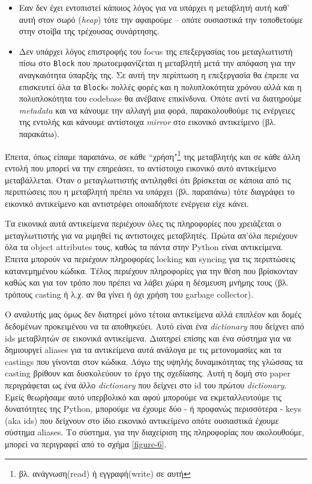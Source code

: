 \begin{itemize}

\item Εαν δεν έχει εντοπιστεί κάποιος λόγος για να υπάρχει η μεταβλητή αυτή
καθ' αυτή στον σωρό (\textit{heap}) τότε την αφαιρούμε – οπότε ουσιαστικά την
τοποθετούμε στην στοίβα της τρέχουσας συνάρτησης.

\item Δεν υπάρχει λόγος επιστροφής του focus της επεξεργασίας του μεταγλωττιστή
πίσω στο \texttt{Block} που πρωτοεμφανίζεται η μεταβλητή μετά την απόφαση για
την αναγκαιότητα ύπαρξής της. Σε αυτή την περίπτωση η επεξεργασία θα έπρεπε να
επισκευτεί όλα τα \texttt{Block}s πολλές φορές και η πολυπλοκότητα χρόνου αλλά
και η πολυπλοκότητα του codebase θα ανέβαινε επικίνδυνα. Οπότε αντί να
διατηρούμε \textit{metadata} και να κάνουμε την αλλαγή μια φορά, παρακολουθούμε
τις ενέργειες της εντολής και κάνουμε αντίστοιχα \textit{mirror} στο εικονικό
αντικείμενο (βλ. παρακάτω).

\end{itemize}

Έπειτα, όπως είπαμε παραπάνω, σε κάθε ``χρήση"\footnote{βλ. ανάγνωση(read) ή
εγγραφή(write) σε αυτή} της μεταβλητής και σε κάθε άλλη εντολή που μπορεί να την
επηρεάσει, το αντίστοιχο εικονικό αυτό αντικείμενο μεταβάλλεται. Όταν ο
μεταγλωττιστής αντιληφθεί ότι βρίσκεται σε κάποια από τις περιπτώσεις που η
μεταβλητή πρέπει να υπάρχει (βλ. παραπάνω) τότε διαγράφει το εικονικό
αντικείμενο και αντιστρέφει οποιαδήποτε ενέργεια είχε κάνει.

Τα εικονικά αυτά αντικείμενα περιέχουν όλες τις πληροφορίες που χρειάζεται ο
μεταγλωττιστής για να μιμηθεί τις αντιστοιχες μεταβλητές. Πρώτα απ'όλα περιέχουν
όλα τα object attributes τους, καθώς τα πάντα στην Python είναι αντικείμενα.
Έπειτα μπορούν να περιέχουν πληροφορίες locking και syncing για τις περιπτώσεις
κατανεμημένου κώδικα. Τέλος περιέχουν πληροφορίες για την θέση που βρίσκονταν
καθώς και για τον τρόπο που πρέπει να λάβει χώρα η δέσμευση μνήμης τους (βλ.
τρόπους casting ή λ.χ. αν θα γίνει ή όχι χρήση του garbage collector).

Ο αναλυτής μας όμως δεν διατηρεί μόνο τέτοια αντικείμενα αλλά επιπλέον και δομές
δεδομένων προκειμένου να τα αποθηκεύει. Αυτό είναι ένα \textit{dictionary} που
δείχνει από ids μεταβλητών σε εικονικά αντικείμενα. Διατηρεί επίσης και ένα
σύστημα για να δημιουργεί aliases για τα αντικείμενα αυτά ανάλογα με τις
μετονομασίες και τα castings που γίνονται στον κώδικα. Λόγω της υψηλής
δυναμικότητας της γλώσσας τα casting βρίθουν και δυσκολεύουν το έργο της
σχεδίασης. Αυτή η δομή στο paper περιγράφεται ως ένα άλλο \textit{dictionary}
που δείχνει στο id του πρώτου \textit{dictionary}. Εμείς θεωρήσαμε αυτό
υπερβολικό και αφού μπορούμε να εκμεταλλευτούμε τις δυνατότητες της Python,
μπορούμε να έχουμε δύο - ή προφανώς περισσότερα - keys (aka ids) που δείχνουν
στο ίδιο εικονικό αντικείμενο οπότε ουσιαστικά έχουμε σύστημα aliases. Το
σύστημα, για την διαχείριση της πληροφορίας που ακολουθούμε, μπορεί να
περιγραφεί από το σχήμα \ref{figure-6}.

